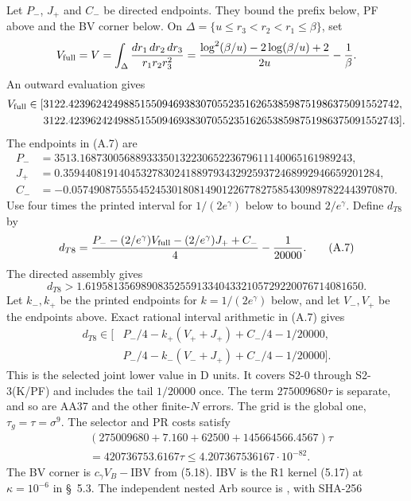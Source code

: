 {Let $P_-$, $J_+$ and $C_-$ be directed endpoints.
They bound the prefix below, PF above and the BV corner below.
On $\Delta=\{u\le r_3<r_2<r_1\le\beta\}$, set
\[
 V_{\rm full}=V
 =\int_\Delta\frac{dr_1\,dr_2\,dr_3}{r_1r_2r_3^2}
 =\frac{\log^2(\beta/u)-2\log(\beta/u)+2}{2u}-\frac1\beta.
\]
An outward evaluation gives
{\small
\[
\begin{aligned}
 V_{\rm full}\in[&
3122.423962424988515509469383070552351626538598751986375091552742,\\
&3122.423962424988515509469383070552351626538598751986375091552743].
\end{aligned}
\]
}
The endpoints in (A.7) are
\[
\begin{aligned}
P_-&=3513.1687300568893335013223065223679611140065161989243,\\
J_+&=0.359440819140453278302418897934329259372468992946659201284,\\
C_-&=-0.0574908755554524530180814901226778275854309897822443970870.
\end{aligned}
\]
Use four times the printed interval for $1/(2e^\gamma)$ below to bound
$2/e^\gamma$. Define $d_{T8}$ by
\[
 d_{T8}=\frac{P_--(2/e^\gamma)V_{\rm full}
                    -(2/e^\gamma)J_++C_-}{4}
              -\frac1{20000}.                         \tag{A.7}
\]
The directed assembly gives
\[
 d_{T8}>
 1.61958135698908352559133404332105729220076714081650.    \tag{A.8}
\]
Let $k_-,k_+$ be the printed endpoints for $k=1/(2e^\gamma)$ below,
and let $V_-,V_+$ be the endpoints above. Exact rational interval
arithmetic in (A.7) gives
\[
\begin{aligned}
 d_{T8}\in\bigl[&P_-/4-k_+(V_++J_+)+C_-/4-1/20000,\\
                 &P_-/4-k_-(V_-+J_+)+C_-/4-1/20000\bigr].
\end{aligned}
\]
This is the selected joint lower value in D units.
It covers S2-0 through S2-3(K/PF)
and includes the tail $1/20000$ once.
The term $275009680\tau$ is separate,
and so are AA37 and the other finite-$N$ errors.
The grid is the global one, $\tau_g=\tau=\sigma^9$.
The selector and PR costs satisfy
\[
\begin{aligned}
 &(275009680+7.160+62500+145664566.4567)\tau\\
 &=420736753.6167\tau\le4.207367536167\cdot10^{-82}.
\end{aligned}
\]
The BV corner is $c_\gamma V_B-\mathrm{IBV}$ from (5.18). IBV is
the R1 kernel (5.17) at $\kappa=10^{-6}$ in \S~5.3. The independent
nested Arb source is , with SHA-256
}
